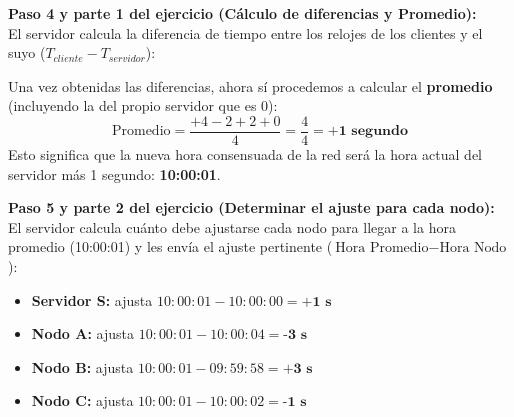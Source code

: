 \documentclass[12pt,a4paper]{article}
\begin{document}
\textbf{Paso 4 y parte 1 del ejercicio (Cálculo de diferencias y Promedio):} \\
El servidor calcula la diferencia de tiempo entre los relojes de los clientes y el suyo ($T_{cliente} - T_{servidor}$):
\begin{center}
\shorthandoff{>}
\shorthandon{>}
\end{center}

Una vez obtenidas las diferencias, ahora sí procedemos a calcular el \textbf{promedio} (incluyendo la del propio servidor que es 0):
$$ \text{Promedio} = \frac{+4 - 2 + 2 + 0}{4} = \frac{4}{4} = \textbf{+1 segundo} $$
Esto significa que la nueva hora consensuada de la red será la hora actual del servidor más 1 segundo: \textbf{10:00:01}.

\vspace{0.3cm}
\textbf{Paso 5 y parte 2 del ejercicio (Determinar el ajuste para cada nodo):} \\
El servidor calcula cuánto debe ajustarse cada nodo para llegar a la hora promedio (10:00:01) y les envía el ajuste pertinente ($\text{Hora Promedio} - \text{Hora Nodo}$):
\begin{itemize}
    \item \textbf{Servidor S:} ajusta $10:00:01 - 10:00:00 = \textbf{+1 s}$
    \item \textbf{Nodo A:} ajusta $10:00:01 - 10:00:04 = \textbf{-3 s}$
    \item \textbf{Nodo B:} ajusta $10:00:01 - 09:59:58 = \textbf{+3 s}$
    \item \textbf{Nodo C:} ajusta $10:00:01 - 10:00:02 = \textbf{-1 s}$
\end{itemize}
\end{document}
